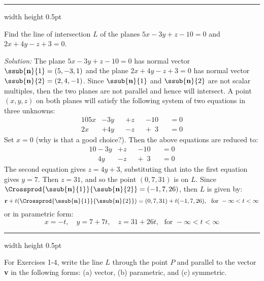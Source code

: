 \vspace{4mm}
\hrule width \textwidth height 0.5pt
\begin{exmp}\label{exmp:planeinter}
 Find the line of intersection $L$ of the planes $5x - 3y + z - 10 = 0$ and $2x + 4y - z + 3 = 0$.\vspace{1mm}
 \par\noindent\emph{Solution:} The plane $5x - 3y + z - 10 = 0$ has normal vector $\ssub{\textbf{n}}{1} = (5,-3,1)$ and
 the plane $2x + 4y - z + 3 = 0$ has normal vector $\ssub{\textbf{n}}{2} = (2,4,-1)$. Since $\ssub{\textbf{n}}{1}$ and
 $\ssub{\textbf{n}}{2}$ are not scalar multiples, then the two planes are not parallel and hence will intersect. A
 point $(x,y,z)$ on both planes will satisfy the following system of two equations in three unknowns:
 \begin{alignat*}{10}
  5x &- 3y &&+ z &&- 10 &&= 0\\
  2x &+ 4y &&- z &&+ \phantom{1}3 &&= 0
 \end{alignat*}
 Set $x = 0$ (why is that a good choice?). Then the above equations are reduced to:
 \begin{alignat*}{10}
  -3y &+ z &&- 10 &&= 0\\
  \phantom{-}4y &- z &&+ \phantom{1}3 &&= 0
 \end{alignat*}
 The second equation gives $z = 4y + 3$, substituting that into the first equation gives $y = 7$. Then $z = 31$,
 and so the point $(0,7,31)$ is on $L$. Since $\Crossprod{\ssub{\textbf{n}}{1}}{\ssub{\textbf{n}}{2}} = (-1,7,26)$,
 then $L$ is given by:
 \begin{displaymath}
  \textbf{r} + t(\Crossprod{\ssub{\textbf{n}}{1}}{\ssub{\textbf{n}}{2}}) = (0,7,31) + t(-1,7,26), \text{~~for~}
  -\infty < t < \infty
 \end{displaymath}
 or in parametric form:
 \begin{displaymath}
  x = -t, \quad y = 7 + 7t, \quad z = 31 +26t, \text{~~for~} -\infty < t < \infty
 \end{displaymath} 
\end{exmp}
\hrule width \textwidth height 0.5pt
\newpage
\centerline{}\label{ssec1dot5}
\par\noindent For Exercises 1-4, write the line $L$ through the point $P$ and parallel to the vector \textbf{v} in the
 following forms: (a) vector, (b) parametric, and (c) symmetric.
